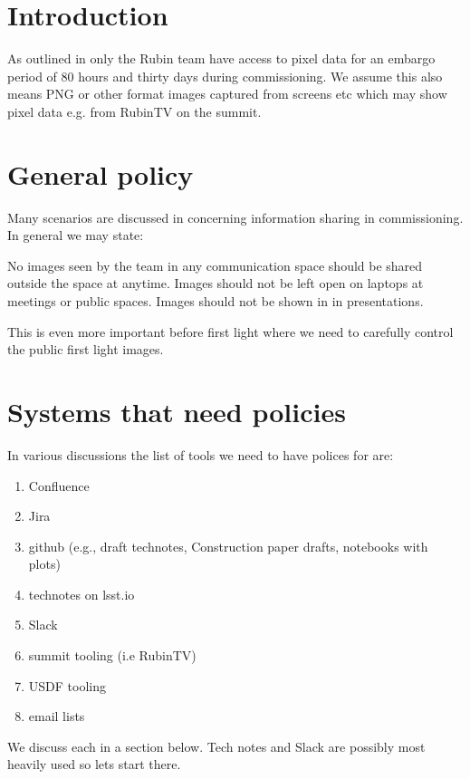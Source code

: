 
\section{Introduction}
As outlined in  only the Rubin team have access to pixel data for an embargo period of 80 hours and thirty days during commissioning. We assume this also means PNG or other format images captured from screens etc which may show pixel data e.g. from RubinTV on the summit.

\section{General policy} \label{sec:genpol}
Many scenarios are discussed in  concerning information sharing in commissioning.
In general we may state:

No images seen by the team in any communication space should be shared outside the space at anytime.
Images should not be left open on laptops at meetings or public spaces.
Images should not be shown in in presentations.


This is even more important before first light where we need to carefully control the public first light images.

\section {Systems that need policies}
In various discussions the list of tools we need to have polices for are:

\begin{enumerate}
    \item Confluence
    \item Jira
    \item github (e.g., draft technotes, Construction paper drafts, notebooks with plots)
    \item technotes on lsst.io
    \item Slack
    \item summit tooling (i.e RubinTV)
    \item USDF tooling
    \item email lists
\end{enumerate}

We discuss each in a section below.
Tech notes and Slack are possibly most heavily used so lets start there.
